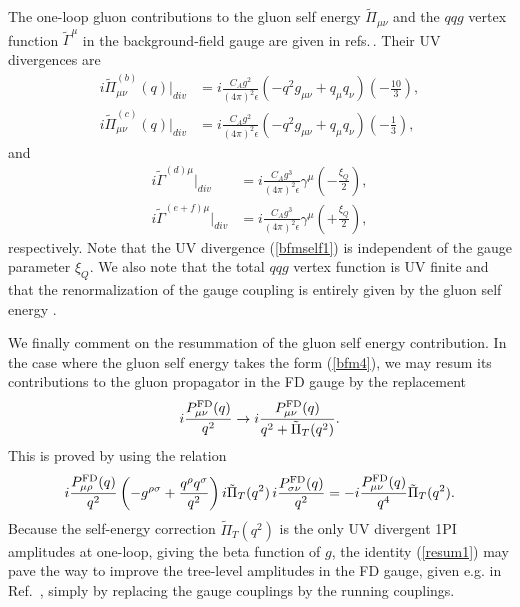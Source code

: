 \documentclass[preprint,amsmath,amssymb,superscriptaddress, floatfix,nofootinbib]{revtex4}
\begin{document}
The one-loop gluon contributions to the gluon self energy $\tilde{\Pi}_{\mu\nu}$ and the
$q{q}g$ vertex function $\tilde{\Gamma}^{\mu}$ in the background-field gauge 
are given in 
refs.\,\cite{Kluberg-Stern:1974nmx,Kluberg-Stern:1975ebk,Abbott:1980hw}. 
Their UV divergences are 
%
\begin{align}
i\tilde{\Pi}_{\mu\nu}^{(b)}(q)|_{div}  &= i\frac{C_A g^2}{(4\pi)^2\epsilon}
\left( -q^2g_{\mu\nu} + q_{\mu}q_{\nu} \right) \left( -\frac{10}{3} \right) ,  
\label{bfmself1}  
\\
%
i\tilde{\Pi}_{\mu\nu}^{(c)} (q)|_{div} 
&= i\frac{C_A g^2}{(4\pi)^2\epsilon} 
\left( -q^2g_{\mu\nu} + q_{\mu}q_{\nu} \right) \left( -\frac{1}{3} \right) ,  
\label{bfmself2}  
\end{align}
%
and
%
\begin{align}
i\tilde{\Gamma}^{(d) \mu}|_{div} &= 
i \frac{C_A g^3}{(4\pi)^2\epsilon} \gamma^{\mu} \left( -\frac{\xi_Q}{2} \right) , 
\\
%
i\tilde{\Gamma}^{(e+f) \mu}|_{div} &= 
i \frac{C_A g^3}{(4\pi)^2\epsilon} \gamma^{\mu} \left( +\frac{\xi_Q}{2} \right) , 
\end{align}
respectively. Note that the UV divergence 
(\ref{bfmself1}) is independent of the gauge parameter $\xi_Q$. 
We also note that the total $q{q}g$ vertex function is UV finite and 
that the renormalization of the gauge coupling is entirely given by the 
gluon self energy \cite{Abbott:1980hw}. 

We finally comment on the resummation of the gluon self energy contribution. 
In the case where 
the gluon self energy takes the form (\ref{bfm4}), we may resum 
its contributions to the gluon propagator in the FD gauge by the replacement 
%
\begin{equation}
i\frac{P^{\rm FD}_{\mu\nu}(q)}{q^2} \to i\frac{P^{\rm FD}_{\mu\nu}(q)}{q^2+\tilde{\Pi}_T(q^2)} .
\label{resum1}
\end{equation}
%
This is proved by using the relation 
%
\begin{equation}
i\frac{P^{\rm FD}_{\mu\rho}(q)}{q^2}  \left( -g^{\rho\sigma} 
+ \frac{ q^{\rho}q^{\sigma} }{q^2} \right) 
i\tilde{\Pi}_T(q^2) 
\,
 i\frac{P^{\rm FD}_{\sigma\nu}(q)}{q^2}
=
- i\frac{P^{\rm FD}_{\mu\nu}(q)}{q^4} \tilde{\Pi}_T(q^2) . 
\label{resum2}
\end{equation}
%
Because the self-energy correction $\tilde{\Pi}_T(q^2)$ is 
the only UV divergent 1PI amplitudes at one-loop, 
giving the beta function of $g$, the identity (\ref{resum1}) 
may pave the way to improve the tree-level 
amplitudes in the FD gauge, given e.g. in Ref.~\cite{Hagiwara:2020tbx}, 
simply by replacing the gauge couplings 
by the  running couplings. 
\end{document}

